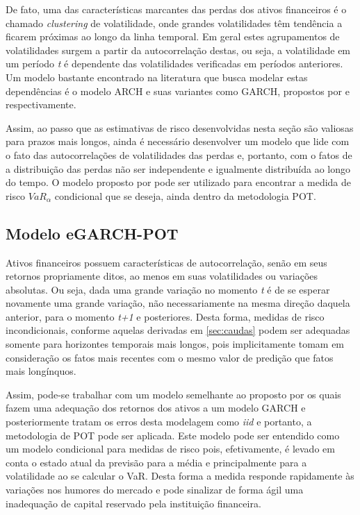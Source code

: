 \documentclass[1p]{elsarticle}
\theoremstyle{definition}
\begin{document}
De fato, uma das características marcantes das perdas dos ativos financeiros é o chamado \emph{clustering} de volatilidade, onde grandes volatilidades têm tendência a ficarem próximas ao longo da linha temporal. Em geral estes agrupamentos de volatilidades surgem a partir da autocorrelação destas, ou seja, a volatilidade em um período \emph{t} é dependente das volatilidades verificadas em períodos anteriores. Um modelo bastante encontrado na literatura que busca modelar estas dependências é o modelo ARCH e suas variantes como GARCH, propostos por \cite{Engle1982} e \cite{Bollerslev1986} respectivamente.

Assim, ao passo que as estimativas de risco desenvolvidas nesta seção são valiosas para prazos mais longos, ainda é necessário desenvolver um modelo que lide com o fato das autocorrelações de volatilidades das perdas e, portanto, com o fatos de a distribuição das perdas não ser independente e igualmente distribuída ao longo do tempo. O modelo proposto por \cite{McNeil2000} pode ser utilizado para encontrar a medida de risco $VaR_\alpha$ condicional que se deseja, ainda dentro da metodologia POT.

\subsection{Modelo eGARCH-POT}
\label{sec:egarchpot}

Ativos financeiros possuem características de autocorrelação, senão em seus retornos propriamente ditos, ao menos em suas volatilidades ou variações absolutas. Ou seja, dada uma grande variação no momento \emph{t} é de se esperar novamente uma grande variação, não necessariamente na mesma direção daquela anterior, para o momento \emph{t+1} e posteriores. Desta forma, medidas de risco incondicionais, conforme aquelas derivadas em \ref{sec:caudas} podem ser adequadas somente para horizontes temporais mais longos, pois implicitamente tomam em consideração os fatos mais recentes com o mesmo valor de predição que fatos mais longínquos.

Assim, pode-se trabalhar com um modelo semelhante ao proposto por \cite{McNeil2000} os quais fazem uma adequação dos retornos dos ativos a um modelo GARCH e posteriormente tratam os erros desta modelagem como \emph{iid} e portanto, a metodologia de POT pode ser aplicada. Este modelo pode ser entendido como um modelo condicional para medidas de risco pois, efetivamente, é levado em conta o estado atual da previsão para a média e principalmente para a volatilidade ao se calcular o VaR. Desta forma a medida responde rapidamente às variações nos humores do mercado e pode sinalizar de forma ágil uma inadequação de capital reservado pela instituição financeira.
\end{document}
